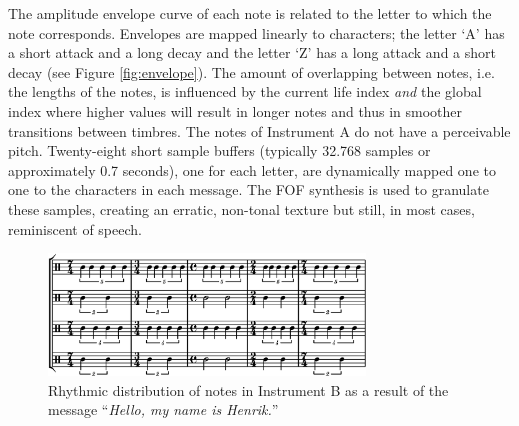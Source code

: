 The amplitude envelope curve of each note is related to the letter to which the note corresponds. Envelopes are mapped linearly to characters; the letter `A' has a short attack and a long decay and the letter `Z' has a long attack and a short decay (see Figure \ref{fig:envelope}). The amount of overlapping between notes, i.e. the lengths of the notes, is influenced by the current life index \emph{and} the global index where higher values will result in longer notes and thus in smoother transitions between timbres. The notes of Instrument A do not have a perceivable pitch. Twenty-eight short sample buffers (typically 32.768 samples or approximately 0.7 seconds), one for each letter, are dynamically mapped one to one to the characters in each message. The FOF synthesis is used to granulate these samples, creating an erratic, non-tonal texture but still, in most cases, reminiscent of speech. 
\begin{figure}[!htb]
  \begin{center}
    \includegraphics[width=0.75\textwidth]{img/ethsnd/harm}
    \caption[Rhythmic distribution of notes in \emph{etherSound}: Instrument B]{Rhythmic distribution of notes in Instrument B as a
      result of the message ``\emph{Hello, my name is
        Henrik.}''} \label{time2}
  \end{center}
\end{figure}

